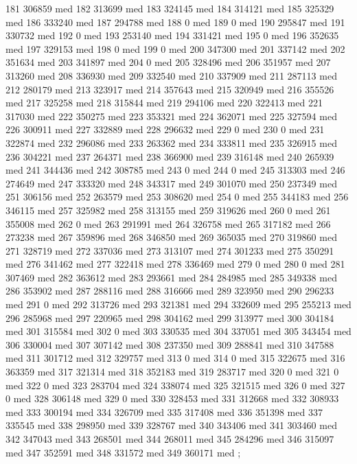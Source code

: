 {181 306859 med
182 313699 med
183 324145 med
184 314121 med
185 325329 med
186 333240 med
187 294788 med
188 0 med
189 0 med
190 295847 med
191 330732 med
192 0 med
193 253140 med
194 331421 med
195 0 med
196 352635 med
197 329153 med
198 0 med
199 0 med
200 347300 med
201 337142 med
202 351634 med
203 341897 med
204 0 med
205 328496 med
206 351957 med
207 313260 med
208 336930 med
209 332540 med
210 337909 med
211 287113 med
212 280179 med
213 323917 med
214 357643 med
215 320949 med
216 355526 med
217 325258 med
218 315844 med
219 294106 med
220 322413 med
221 317030 med
222 350275 med
223 353321 med
224 362071 med
225 327594 med
226 300911 med
227 332889 med
228 296632 med
229 0 med
230 0 med
231 322874 med
232 296086 med
233 263362 med
234 333811 med
235 326915 med
236 304221 med
237 264371 med
238 366900 med
239 316148 med
240 265939 med
241 344436 med
242 308785 med
243 0 med
244 0 med
245 313303 med
246 274649 med
247 333320 med
248 343317 med
249 301070 med
250 237349 med
251 306156 med
252 263579 med
253 308620 med
254 0 med
255 344183 med
256 346115 med
257 325982 med
258 313155 med
259 319626 med
260 0 med
261 355008 med
262 0 med
263 291991 med
264 326758 med
265 317182 med
266 273238 med
267 359896 med
268 346850 med
269 365035 med
270 319860 med
271 328719 med
272 337036 med
273 313107 med
274 301233 med
275 350291 med
276 341462 med
277 322418 med
278 336469 med
279 0 med
280 0 med
281 307469 med
282 363612 med
283 293661 med
284 284985 med
285 349338 med
286 353902 med
287 288116 med
288 316666 med
289 323950 med
290 296233 med
291 0 med
292 313726 med
293 321381 med
294 332609 med
295 255213 med
296 285968 med
297 220965 med
298 304162 med
299 313977 med
300 304184 med
301 315584 med
302 0 med
303 330535 med
304 337051 med
305 343454 med
306 330004 med
307 307142 med
308 237350 med
309 288841 med
310 347588 med
311 301712 med
312 329757 med
313 0 med
314 0 med
315 322675 med
316 363359 med
317 321314 med
318 352183 med
319 283717 med
320 0 med
321 0 med
322 0 med
323 283704 med
324 338074 med
325 321515 med
326 0 med
327 0 med
328 306148 med
329 0 med
330 328453 med
331 312668 med
332 308933 med
333 300194 med
334 326709 med
335 317408 med
336 351398 med
337 335545 med
338 298950 med
339 328767 med
340 343406 med
341 303460 med
342 347043 med
343 268501 med
344 268011 med
345 284296 med
346 315097 med
347 352591 med
348 331572 med
349 360171 med
};
